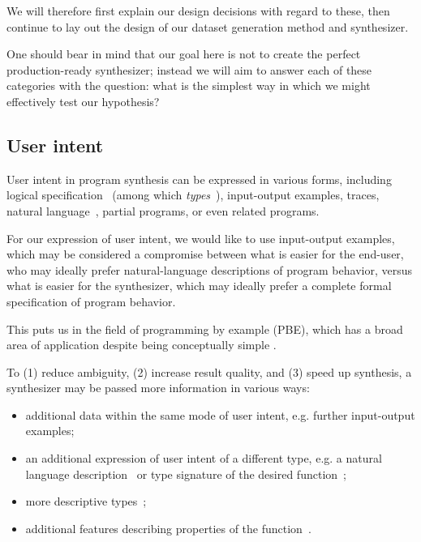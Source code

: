 \documentclass{article}
\begin{document}
We will therefore first explain our design decisions with regard to these,
then continue to lay out the design of our dataset generation method and synthesizer.

One should bear in mind that our goal here is not to create the perfect production-ready synthesizer;
instead we will aim to answer each of these categories with the question:
what is the simplest way in which we might effectively test our hypothesis?

\subsection{User intent}

User intent in program synthesis can be expressed in various forms, including logical specification~\citep{temporalstreamlogic} (among which \emph{types}~\citep{synquid}),
input-output examples, traces, natural language~\citep{abstractsyntaxnetworks},
partial programs, or even related programs.~\citep{gulwani2017program}

For our expression of user intent, we would like to use input-output examples,
which may be considered a compromise between what is easier for the end-user,
who may ideally prefer natural-language descriptions of program behavior,
versus what is easier for the synthesizer,
which may ideally prefer a complete formal specification of program behavior.

This puts us in the field of programming by example (PBE),
which has a broad area of application despite being conceptually simple%
.

To (1) reduce ambiguity, (2) increase result quality, and (3) speed up synthesis, a synthesizer may be passed more information in various ways:
\begin{itemize}
    \item additional data within the same mode of user intent, e.g. further input-output examples;
    \item an additional expression of user intent of a different type, e.g. a natural language description~\citep{polosukhin2018neural} or type signature of the desired function~\citep{myth};
    \item more descriptive types~\citep{synquid};
    \item additional features describing properties of the function~\citep{odena2020learning}.
\end{itemize}
\end{document}
